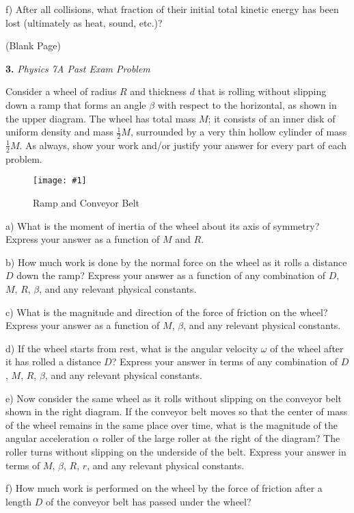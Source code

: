 \documentclass[11pt]{article}
\newcommand{\fig}[4]{
    \begin{figure}[H]
        \centering
        \texttt{[image: \#1]}
        \caption{#2}
        \label{exp4fit}
    \end{figure}
}
\theoremstyle{gangnamstyle}{\newtheorem{definition}{Definition}[]}
\theoremstyle{gangnamstyle}{\newtheorem{example}{Example}[]}
\theoremstyle{gangnamstyle}{\newtheorem{problem}{Problem}[]}
\begin{document}
f) After all collisions, what fraction of their initial total kinetic energy has been lost (ultimately as heat, sound, etc.)?

\pagebreak

\begin{center}
(Blank Page)
\end{center}

\pagebreak

\textbf{3.} \textit{Physics 7A Past Exam Problem}

Consider a wheel of radius $R$ and thickness $d$ that is rolling without slipping down a ramp that forms an angle $\beta$ with respect to the horizontal, as shown in the upper diagram. The wheel has total mass $M$; it consists of an inner disk of uniform density and mass $\frac{1}{2}M$, surrounded by a very thin hollow cylinder of mass $\frac{1}{2}M$. As always, show your work and/or justify your answer for every part of each problem.

\fig{figs/mt2/deweese6.png}{Ramp and Conveyor Belt}{0.5}{0}

a) What is the moment of inertia of the wheel about its axis of symmetry? Express your answer as a function of $M$ and $R$.

b) How much work is done by the normal force on the wheel as it rolls a distance $D$ down the ramp? Express your answer as a function of any combination of $D$, $M$, $R$, $\beta$, and any relevant physical constants.

c) What is the magnitude and direction of the force of friction on the wheel? Express your answer as a function of $M$, $\beta$, and any relevant physical constants.

d) If the wheel starts from rest, what is the angular velocity $\omega$ of the wheel after it has rolled a distance $D$? Express your answer in terms of any combination of $D$, $M$, $R$, $\beta$, and any relevant physical constants.

e) Now consider the same wheel as it rolls without slipping on the conveyor belt shown in the right diagram. If the conveyor belt moves so that the center of mass of the wheel remains in the same place over time, what is the magnitude of the angular acceleration $\alpha$ roller of the large roller at the right of the diagram? The roller turns without slipping on the underside of the belt. Express your answer in terms of $M$, $\beta$, $R$, $r$, and any relevant physical constants.

f) How much work is performed on the wheel by the force of friction after a length $D$ of the conveyor belt has passed under the wheel?
\end{document}
